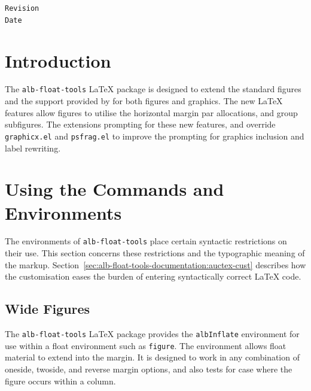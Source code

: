 \documentclass[11pt,a4paper,oneside,titlepage]{alb-latex}
\begin{document}
\begin{albTitlePage}

  \verb$Revision$\\
  \verb$Date$

\end{albTitlePage}




\section{Introduction}
\label{sec:alb-float-tools-documentation:intr}

The \texttt{alb-float-tools} \LaTeX{} package is designed to extend the
standard figures and the support provided by \AUCTeX{} for both figures
and graphics.  The new \LaTeX{} features allow figures to utilise the
horizontal margin par allocations, and group subfigures.  The \AUCTeX{}
extensions prompting for these new features, and override
\texttt{graphicx.el} and \texttt{psfrag.el} to improve the prompting for
graphics inclusion and label rewriting.




\section{Using the Commands and Environments}
\label{sec:alb-float-tools-documentation:using-comm-envir}

The environments of \texttt{alb-float-tools} place certain syntactic
restrictions on their use.  This section concerns these restrictions and
the typographic meaning of the markup.
Section~\ref{sec:alb-float-tools-documentation:auctex-cust} describes
how the \AUCTeX{} customisation eases the burden of entering
syntactically correct \LaTeX{} code.


\subsection{Wide Figures}
\label{sec:alb-float-tools-documentation:wide-figures}

The \texttt{alb-float-tools} \LaTeX{} package provides the
\texttt{albInflate} environment for use within a float environment such
as \texttt{figure}.  The environment allows float material to extend
into the margin.  It is designed to work in any combination of oneside,
twoside, and reverse margin options, and also tests for case where the
figure occurs within a column.
\end{document}
